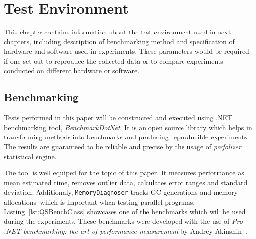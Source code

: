 \chapter{Test Environment} 
\label{chap:3}
This chapter contains information about the test environment used in next chapters, including description of benchmarking method and specification of hardware and software used in experiments. These parameters would be required if one set out to reproduce the collected data or to compare experiments conducted on different hardware or software.

\section{Benchmarking}
Tests performed in this paper will be constructed and executed using .NET benchmarking tool, \emph{BenchmarkDotNet}. It is an open source library which helps in transforming methods into benchmarks and producing reproducible experiments. The results are guaranteed to be reliable and precise by the usage of \emph{perfolizer} statistical engine. 

The tool is well equiped for the topic of this paper. It measures performance as mean estimated time, removes outlier data, calculates error ranges and standard deviation. Additionaly, \texttt{MemoryDiagnoser} tracks GC generations and memory allocations, which is important when testing parallel programs. Listing~\ref{lst:QSBenchClass} showcases one of the benchmarks which will be used during the experiments.
These benchmarks were developed with the use of \emph{Pro .NET benchmarking: the art of performance measurement} by Andrey Akinshin~\cite{Akinshin2019}.

